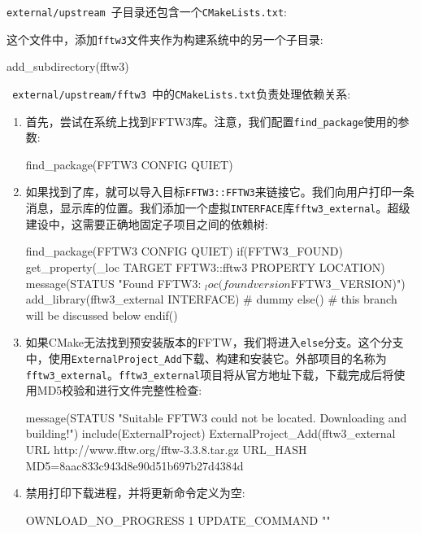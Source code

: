 \texttt{external/upstream }子目录还包含一个\texttt{CMakeLists.txt}:

这个文件中，添加\texttt{fftw3}文件夹作为构建系统中的另一个子目录:

\begin{codebox}[cmake]
add_subdirectory(fftw3)
\end{codebox}

\texttt{ external/upstream/fftw3 }中的\texttt{CMakeLists.txt}负责处理依赖关系:

\begin{enumerate}
\item 首先，尝试在系统上找到FFTW3库。注意，我们配置\texttt{find\_package}使用的参数:

\begin{codebox}[cmake]
find_package(FFTW3 CONFIG QUIET)
\end{codebox}

\item 如果找到了库，就可以导入目标\texttt{FFTW3::FFTW3}来链接它。我们向用户打印一条消息，显示库的位置。我们添加一个虚拟\texttt{INTERFACE}库\texttt{fftw3\_external}。超级建设中，这需要正确地固定子项目之间的依赖树:

\begin{codebox}[cmake]
find_package(FFTW3 CONFIG QUIET)
if(FFTW3_FOUND)
  get_property(_loc TARGET FFTW3::fftw3 PROPERTY LOCATION)
  message(STATUS "Found FFTW3: ${_loc} (found version ${FFTW3_VERSION})")
    add_library(fftw3_external INTERFACE) # dummy
else()
    # this branch will be discussed below
endif()
\end{codebox}

\item 如果CMake无法找到预安装版本的FFTW，我们将进入\texttt{else}分支。这个分支中，使用\texttt{ExternalProject\_Add}下载、构建和安装它。外部项目的名称为\texttt{fftw3\_external}。\texttt{fftw3\_external}项目将从官方地址下载，下载完成后将使用MD5校验和进行文件完整性检查:

\begin{codebox}[cmake]
message(STATUS "Suitable FFTW3 could not be located. Downloading and building!")
include(ExternalProject)
ExternalProject_Add(fftw3_external
  URL
    http://www.fftw.org/fftw-3.3.8.tar.gz
  URL_HASH
    MD5=8aac833c943d8e90d51b697b27d4384d
\end{codebox}

\item 禁用打印下载进程，并将更新命令定义为空:

\begin{codebox}[cmake]
OWNLOAD_NO_PROGRESS
    1
UPDATE_COMMAND
    ""  
\end{codebox}


\end{enumerate}
